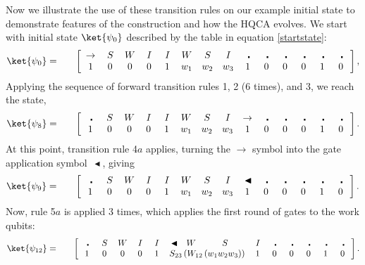 \documentclass[11pt,letterpaper]{article}
\newcommand{\<}{\langle}
\renewcommand{\>}{\rangle}
\newcommand{\gat}{\,\blacktriangleleft}  %
\newcommand{\bul}{\:\:\centerdot\:}       %
\newcommand{\iga}{\:I\,}                  %
\newcommand{\wga}{W}						%
\newcommand{\sga}{\:S\,}					%
\begin{document}
Now we illustrate the use of these transition rules on our example initial state to demonstrate features of the construction and how the HQCA evolves. We start with initial state $\ket{\psi_0}$ described by the table in equation \ref{startstate}:
\begin{eqnarray}
	\ket{\psi_{0}} &=& \quad \left[ \begin{array}{cccccccccccccc}
		\rightarrow & \sga & \wga & \iga & \iga & 
		\wga & \sga & \iga & \bul &
		\bul & \bul & \bul & \bul & \bul 
		\\		
		1    & 0    & 0    & 0    & 1    & 
		w_1 & w_2 & w_3
		 &
		1    & 0    & 0    & 0    & 1	& 0	
 	\end{array} \right], \label{psi0}
\end{eqnarray}
Applying the sequence of forward transition rules 1, 2 (6 times), and 3, we reach the state,
\begin{eqnarray}
	\ket{\psi_{8}} &=& \quad \left[ \begin{array}{cccccccccccccc}
		\bul & \sga & \wga & \iga & \iga  & 
		\wga & \sga & \iga & \rightarrow  &
		\bul & \bul & \bul & \bul & \bul 
		\\		
		1    & 0    & 0    & 0    & 1    & 
		w_1 & w_2 & w_3
		 &
		1    & 0    & 0    & 0    & 1	& 0	
 	\end{array} \right]. \label{psi8}
\end{eqnarray}
At this point, transition rule 4$a$ applies, turning the $\rightarrow$ symbol into the gate application symbol $\gat$, giving
\begin{eqnarray}
	\ket{\psi_{9}} &=& \quad \left[ \begin{array}{cccccccccccccc}
		\bul & \sga & \wga & \iga & \iga  & 
		\wga & \sga & \iga & \gat &
		\bul & \bul & \bul & \bul & \bul 
		\\		
		1    & 0    & 0    & 0    & 1    & 
		w_1 & w_2 & w_3
		 &
		1    & 0    & 0    & 0    & 1	& 0	
 	\end{array} \right]. \label{psi9}
\end{eqnarray}
Now, rule 5$a$ is applied 3 times, which applies the first round of gates to the work qubits:
\begin{eqnarray}
	\ket{\psi_{12}} &=& \quad \left[ \begin{array}{cccccccccccccc}
		\bul & \sga & \wga & \iga & \iga & \gat & 
		\wga & \sga & \iga & 
		\bul & \bul & \bul & \bul & \bul 
		\\		
		1    & 0    & 0    & 0    & 1    & 
		\multicolumn{3}{c}{S_{23}\left(W_{12}\left(w_1w_2w_3\right)\right)}
		 &
		1    & 0    & 0    & 0    & 1	& 0	
 	\end{array} \right]. \label{psi12}
\end{eqnarray}
\end{document}
